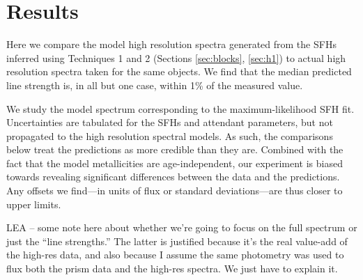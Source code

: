 \documentclass[a4paper,fleqn,usenatbib]{mnras}
\newcommand{\bfb}{\color{myblue}}
\begin{document}
\section{Results}
\label{sec:results}

Here we compare the model high resolution spectra generated from the SFHs inferred using 
Techniques 1 and 2 (Sections \ref{sec:blocks}, \ref{sec:h1}) to actual high resolution spectra taken for
the same objects. We find that the median predicted line strength is, in all but one case, within 1\% 
of the measured value. 

We study the model spectrum corresponding to
the maximum-likelihood SFH fit. Uncertainties are tabulated for the SFHs and attendant 
parameters, but not propagated to the high resolution spectral models. As such,
the comparisons below treat the predictions as more credible than they are. Combined with the fact 
that the model metallicities are age-independent, our experiment is biased towards 
revealing significant differences between the data and the predictions. Any offsets we find---in units
of flux or standard deviations---are thus closer to upper limits. %

{\bfb LEA -- some note here about whether we're going to focus on the full spectrum or just the ``line
strengths.'' The latter is justified because it's the real value-add of the high-res data, and also because
I assume the same photometry was used to flux both the prism data and the high-res spectra. We
just have to explain it.}


\end{document}
